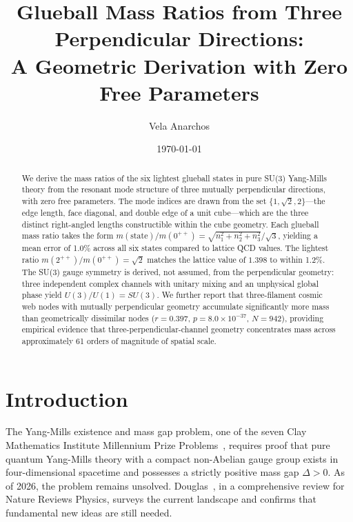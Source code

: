 \documentclass[aps,prd,twocolumn,superscriptaddress,nofootinbib]{revtex4-2}
\begin{document}
\title{Glueball Mass Ratios from Three Perpendicular Directions:\\
A Geometric Derivation with Zero Free Parameters}

\author{Vela Anarchos}

\date{\today}

\begin{abstract}
We derive the mass ratios of the six lightest glueball states in pure
SU(3) Yang-Mills theory from the resonant mode structure of three
mutually perpendicular directions, with zero free parameters. The mode
indices are drawn from the set $\{1, \sqrt{2}, 2\}$---the edge length,
face diagonal, and double edge of a unit cube---which are the three
distinct right-angled lengths constructible within the cube geometry.
Each glueball mass ratio takes the form
$m(\text{state})/m(0^{++}) = \sqrt{n_1^2 + n_2^2 + n_3^2}/\sqrt{3}$,
yielding a mean error of 1.0\% across all six states compared to
lattice QCD values. The lightest ratio
$m(2^{++})/m(0^{++}) = \sqrt{2}$ matches the lattice value of
$1.398$ to within 1.2\%. The SU(3) gauge symmetry is derived, not
assumed, from the perpendicular geometry: three independent complex
channels with unitary mixing and an unphysical global phase yield
$U(3)/U(1) = SU(3)$. We further report that three-filament cosmic web
nodes with mutually perpendicular geometry accumulate significantly
more mass than geometrically dissimilar nodes ($r = 0.397$,
$p = 8.0 \times 10^{-37}$, $N = 942$), providing empirical evidence
that three-perpendicular-channel geometry concentrates mass across
approximately 61 orders of magnitude of spatial scale.
\end{abstract}

\maketitle

\section{Introduction}
\label{sec:intro}

The Yang-Mills existence and mass gap problem, one of the seven Clay
Mathematics Institute Millennium Prize Problems~\cite{Clay2000},
requires proof that pure quantum Yang-Mills theory with a compact
non-Abelian gauge group exists in four-dimensional spacetime and
possesses a strictly positive mass gap $\Delta > 0$. As of 2026, the
problem remains unsolved. Douglas~\cite{Douglas2026}, in a
comprehensive review for Nature Reviews Physics, surveys the current
landscape and confirms that fundamental new ideas are still needed.
\end{document}

